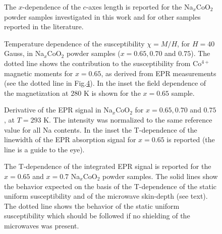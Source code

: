 \documentclass[prb,showpacs,preprintnumbers,amsmath,amssymb,floatfix]{revtex4}
\begin{document}
\begin{references}
\end{references}


\begin{figure}
 \caption{The
$x$-dependence of the $c$-axes length is reported for the
Na$_x$CoO$_2$ powder samples investigated in this work and for
other samples reported in the literature.} \label{XRD}
\end{figure}

\begin{figure}
\caption{Temperature dependence of the susceptibility $\chi =M/H$,
for $H= 40$ Gauss, in Na$_x$CoO$_2$ powder samples ($x=0.65, 0.70$
and $0.75$). The dotted line shows the contribution to the
susceptibility from Co$^{4+}$ magnetic moments for $x=0.65$, as
derived from EPR measurements (see the dotted line in
Fig.\ref{spEPRvsT}). In the inset the field dependence of the
magnetization at $280$ K is shown for the $x=0.65$ sample. }
\label{FigchivsT}
\end{figure}

\begin{figure}
 \caption{Derivative of
the EPR signal in Na$_x$CoO$_2$ for $x=0.65, 0.70$ and $0.75$, at
$T=293$ K. The intensity was normalized to the same reference
value for all Na contents. In the inset the T-dependence of the
linewidth of the EPR absorption signal for $x=0.65$ is reported
(the line is a guide to the eye).} \label{spEPR}
\end{figure}

\begin{figure}
\caption{The T-dependence of the integrated EPR signal is reported
for the $x=0.65$ and $x=0.7$ Na$_x$CoO$_2$ powder samples. The
solid lines show the behavior expected on the basis of the
T-dependence of the static uniform susceptibility and of the
microwave skin-depth (see text). The dotted line shows the
behavior of the static uniform susceptibility which should be
followed if no shielding of the microwaves was present.}
\label{spEPRvsT}
\end{figure}
\end{document}
